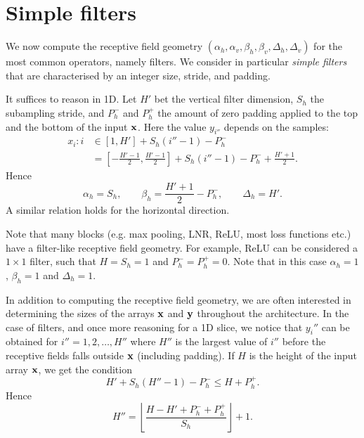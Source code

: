 \section{Simple filters}\label{s:receptive-simple-filters}

We now compute the receptive field geometry $(\alpha_h,\alpha_v,\beta_h,\beta_v,\Delta_h,\Delta_v)$ for the most common operators, namely filters. We consider in particular \emph{simple filters} that are characterised by an integer size, stride, and padding.

It suffices to reason in 1D.  Let $H'$ bet the vertical filter dimension, $S_h$ the subampling stride, and $P_h^-$ and $P_h^+$ the amount of zero padding applied to the top and the bottom of the input $\mathbf{x}$. Here the value $y_{i''}$ depends on the samples:
\begin{align*}
 x_i : i
 &\in
 [1, H'] + S_h (i'' - 1) - P_h^-
 \\
&=
[-\frac{H'-1}{2}, \frac{H'-1}{2}] + S_h (i''-1) - P_h^- + \frac{H'+1}{2}.
\end{align*}
Hence
\[
\alpha_h = S_h,
\qquad
\beta _h = \frac{H'+1}{2} - P_h^-,
\qquad
\Delta_h = H'.
\]
A similar relation holds for the horizontal direction.

Note that many blocks (e.g. max pooling, LNR, ReLU, most loss functions etc.) have a filter-like receptive field geometry. For example, ReLU can be considered a $1 \times 1$ filter, such that $H = S_h=1$ and $P_h^-=P_h^+ =0$. Note that in this case $\alpha_h=1$, $\beta_h=1$ and $\Delta_h=1$.

In addition to computing the receptive field geometry, we are often interested in determining the sizes of the arrays $\mathbf{x}$ and $\mathbf{y}$ throughout the architecture. In the case of filters, and once more reasoning for a 1D slice, we notice that $y_i''$ can be obtained for $i''=1,2,\dots,H''$ where $H''$ is the largest value of $i''$ before the receptive fields falls outside $\mathbf{x}$ (including padding). If $H$ is the height of the input array $\mathbf{x}$, we get the condition
\[
   H' + S_h (H'' - 1) - P_h^- \leq H + P_h^+.
\]
Hence
\begin{equation}\label{e:filtered-height}
   H'' = \left\lfloor \frac{H - H' + P_h^- + P_h^+}{S_h} \right\rfloor + 1.	
\end{equation}

